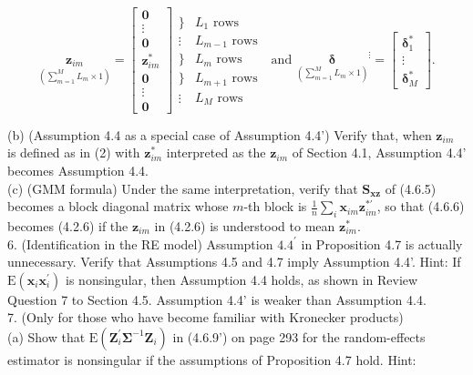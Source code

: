 \documentclass[10pt]{article}
\begin{document}
\[
\underset{\left(\sum_{m=1}^{M} L_{m} \times 1\right)}{\mathbf{z}_{i m}}=\left[\begin{array}{c}
\mathbf{0}  \tag{2}\\
\vdots \\
\mathbf{0} \\
\mathbf{z}_{i m}^{*} \\
\mathbf{0} \\
\vdots \\
\mathbf{0}
\end{array}\right] \begin{array}{ll}
\} & L_{1} \text { rows } \\
\vdots & L_{m-1} \text { rows } \\
\} & L_{m} \text { rows } \\
\} & L_{m+1} \text { rows } \\
\vdots & L_{M} \text { rows }
\end{array} \text { and }{\underset{\left(\sum_{m=1}^{M} L_{m} \times 1\right)}{\boldsymbol{\delta}}}^{\vdots}=\left[\begin{array}{c}
\boldsymbol{\delta}_{1}^{*} \\
\vdots \\
\boldsymbol{\delta}_{M}^{*}
\end{array}\right] .
\]

(b) (Assumption 4.4 as a special case of Assumption 4.4') Verify that, when $\mathbf{z}_{i m}$ is defined as in (2) with $\mathbf{z}_{i m}^{*}$ interpreted as the $\mathbf{z}_{i m}$ of Section 4.1, Assumption 4.4' becomes Assumption 4.4.\\
(c) (GMM formula) Under the same interpretation, verify that $\mathbf{S}_{\mathbf{x z}}$ of (4.6.5) becomes a block diagonal matrix whose $m$-th block is $\frac{1}{n} \sum_{i} \mathbf{x}_{i m} \mathbf{z}_{i m}^{* \prime}$, so that (4.6.6) becomes (4.2.6) if the $\mathbf{z}_{i m}$ in (4.2.6) is understood to mean $\mathbf{z}_{i m}^{*}$.\\
6. (Identification in the RE model) Assumption $4.4^{\prime}$ in Proposition 4.7 is actually unnecessary. Verify that Assumptions 4.5 and 4.7 imply Assumption 4.4'. Hint: If $\mathrm{E}\left(\mathbf{x}_{i} \mathbf{x}_{i}^{\prime}\right)$ is nonsingular, then Assumption 4.4 holds, as shown in Review Question 7 to Section 4.5. Assumption 4.4' is weaker than Assumption 4.4.\\
7. (Only for those who have become familiar with Kronecker products)\\
(a) Show that $\mathrm{E}\left(\mathbf{Z}_{i}^{\prime} \boldsymbol{\Sigma}^{-1} \mathbf{Z}_{i}\right)$ in (4.6.9') on page 293 for the random-effects estimator is nonsingular if the assumptions of Proposition 4.7 hold. Hint:
\end{document}
